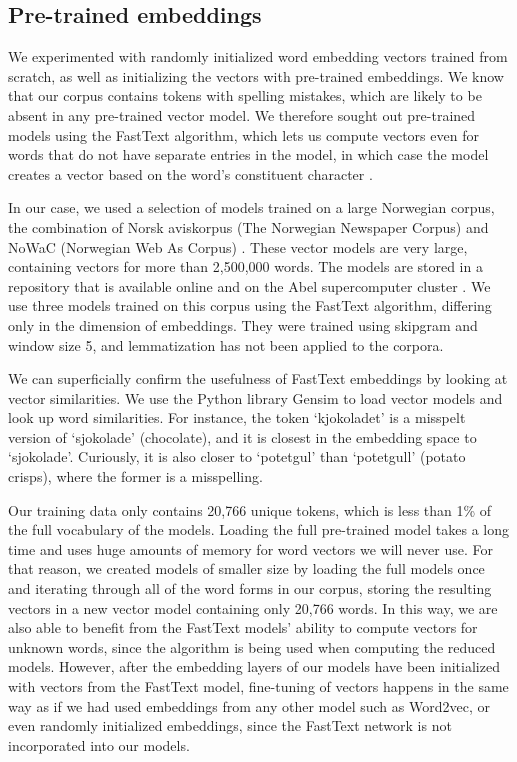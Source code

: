 \subsection{Pre-trained embeddings}
\label{subseq:fasttext}

We experimented with randomly initialized word embedding vectors trained from
scratch, as well as initializing the vectors with pre-trained embeddings. We
know that our corpus contains tokens with spelling mistakes, which are likely
to be absent in any pre-trained vector model. We therefore sought out
pre-trained models using the FastText algorithm, which lets us compute
vectors even for words that do not have separate entries in the model, in
which case the model creates a vector based on the word's constituent
character \ngrams.

In our case, we used a selection of models trained on a large Norwegian
corpus, the combination of Norsk aviskorpus (The Norwegian Newspaper Corpus)
and NoWaC (Norwegian Web As Corpus) \autocite{stadsnes2018}. These vector
models are very large, containing vectors for more than 2,500,000 words. The
models are stored in a repository that is available online and on the Abel
supercomputer cluster \autocite{murhaf2017repository}. We use three models
trained on this corpus using the FastText algorithm, differing only in the
dimension of embeddings. They were trained using skipgram and window size 5, 
and lemmatization has not been applied to the corpora.

We can superficially confirm the usefulness of FastText embeddings by looking
at vector similarities. We use the Python library Gensim \autocite{gensim} to
load vector models and look up word similarities. For instance, the token
`kjokoladet' is a misspelt version of `sjokolade' (chocolate), and it is
closest in the embedding space to `sjokolade'. Curiously, it is also closer
to `potetgul' than `potetgull' (potato crisps), where the former is a
misspelling.

Our training data only contains 20,766 unique tokens, which is less than 1\%
of the full vocabulary of the models. Loading the full pre-trained model
takes a long time and uses huge amounts of memory for word vectors we will
never use. For that reason, we created models of smaller size by loading the
full models once and iterating through all of the word forms in our corpus,
storing the resulting vectors in a new vector model containing only 20,766
words. In this way, we are also able to benefit from the FastText models'
ability to compute vectors for unknown words, since the \ngram algorithm is
being used when computing the reduced models. However, after the embedding
layers of our models have been initialized with vectors from the FastText
model, fine-tuning of vectors happens in the same way as if we had used
embeddings from any other model such as Word2vec, or even randomly
initialized embeddings, since the FastText network is not incorporated into
our models.

